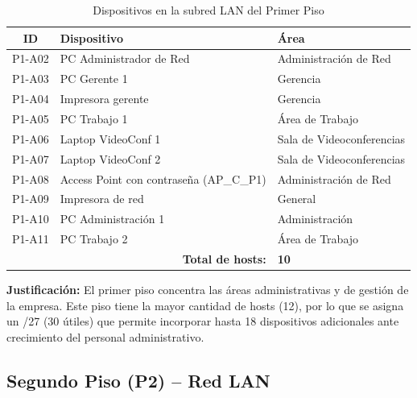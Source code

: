 \documentclass[letterpaper,11pt]{article}
\begin{document}
\begin{table}[H]
\centering
\caption{Dispositivos en la subred LAN del Primer Piso}
\begin{tabular}{|c|l|l|}
\hline
\textbf{ID} & \textbf{Dispositivo} & \textbf{Área} \\
\hline
P1-A02 & PC Administrador de Red & Administración de Red \\
P1-A03 & PC Gerente 1 & Gerencia \\
P1-A04 & Impresora gerente & Gerencia \\
P1-A05 & PC Trabajo 1 & Área de Trabajo \\
P1-A06 & Laptop VideoConf 1 & Sala de Videoconferencias \\
P1-A07 & Laptop VideoConf 2 & Sala de Videoconferencias \\
P1-A08 & Access Point con contraseña (AP\_C\_P1) & Administración de Red \\
P1-A09 & Impresora de red & General \\
P1-A10 & PC Administración 1 & Administración \\
P1-A11 & PC Trabajo 2 & Área de Trabajo \\
\hline
\multicolumn{2}{|r|}{\textbf{Total de hosts:}} & \textbf{10} \\
\hline
\end{tabular}
\end{table}

\textbf{Justificación:} El primer piso concentra las áreas administrativas y de gestión de la empresa. Este piso tiene la mayor cantidad de hosts (12), por lo que se asigna un /27 (30 útiles) que permite incorporar hasta 18 dispositivos adicionales ante crecimiento del personal administrativo.

\subsection{Segundo Piso (P2) -- Red LAN}
\end{document}
